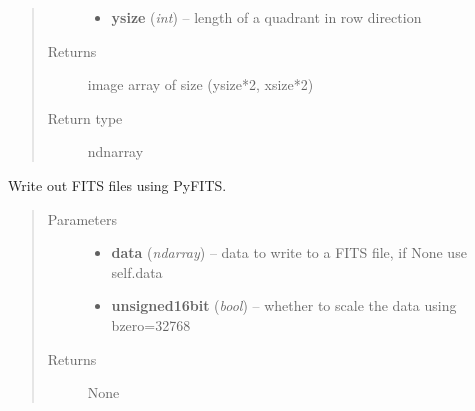 \documentclass[a4paper,11pt,english]{sphinxmanual}
\begin{document}
\begin{fulllineitems}
\begin{fulllineitems}
\begin{quote}
\begin{description}
\begin{itemize}
\item {} 
\textbf{ysize} (\emph{int}) -- length of a quadrant in row direction

\end{itemize}

\item[{Returns}] \leavevmode
image array of size (ysize*2, xsize*2)

\item[{Return type}] \leavevmode
ndnarray

\end{description}\end{quote}

\end{fulllineitems}


\begin{fulllineitems}
\label{postproc:postproc.tileCCD.tileCCD.writeFITSfile}
Write out FITS files using PyFITS.
\begin{quote}\begin{description}
\item[{Parameters}] \leavevmode\begin{itemize}
\item {} 
\textbf{data} (\emph{ndarray}) -- data to write to a FITS file, if None use self.data

\item {} 
\textbf{unsigned16bit} (\emph{bool}) -- whether to scale the data using bzero=32768

\end{itemize}

\item[{Returns}] \leavevmode
None

\end{description}\end{quote}

\end{fulllineitems}


\end{fulllineitems}

\label{postproc:module-postproc.tileFPA}
\end{document}
